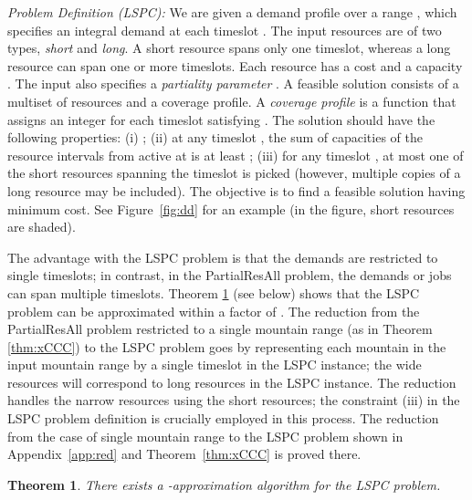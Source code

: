 \documentclass[11pt]{article}
\newtheorem{theorem}{Theorem}
\newcommand{\PResAll}{{\sc PartialResAll}}
\newcommand{\lspc}{{\sc LSPC}}
\begin{document}
{\it  Problem Definition (\lspc):} 
We are given a demand profile over a range , 
which specifies an integral demand  at each timeslot .
The input resources are of two types, {\em short} and {\em long}. 
A short resource spans only one timeslot, whereas a long resource can span one or more timeslots.
Each resource  has a cost  and a capacity . 
The input also specifies a {\em partiality parameter} . 
A feasible solution  consists of a multiset of resources  and a coverage profile.
A {\em coverage profile} is a function that assigns
an integer  for each timeslot  satisfying .
The solution should have the following properties: 
(i) ;
(ii) at any timeslot , the sum of capacities of the resource intervals from  active at  is at least ;
(iii) for any timeslot , at most one of the short resources spanning the timeslot  
is picked (however, multiple copies of a long resource may be included). 
The objective is to find a feasible solution having minimum cost. 
See Figure~\ref{fig:dd} for an example (in the figure, short resources are shaded).

\begin{figure*}[t]
\begin{center}
\end{center}
\caption{The {\lspc} problem}
\label{fig:dd}
\end{figure*}

The advantage with the {\lspc} problem is that the demands are restricted to single timeslots; in contrast,
in the {\PResAll} problem, the demands or jobs can span multiple timeslots.
Theorem \ref{thm:xEEE} (see below) shows that the {\lspc} problem can be approximated within a factor of .
The reduction from the {\PResAll} problem restricted to a single mountain range 
(as in Theorem \ref{thm:xCCC}) to the {\lspc} problem goes by representing each mountain in the input mountain
range  by a single timeslot in the {\lspc} instance; 
the wide resources will correspond to long resources in the {\lspc} instance.
The reduction handles the narrow resources using the short resources; the
constraint (iii) in the {\lspc} problem definition is crucially employed in this process.
The reduction from the case of single mountain range to the {\lspc} problem 
shown in Appendix~\ref{app:red} and Theorem~\ref{thm:xCCC} is proved there.





\begin{theorem}
\label{thm:xEEE}
There exists a -approximation algorithm for the {\lspc} problem.
\end{theorem}
\end{document}
